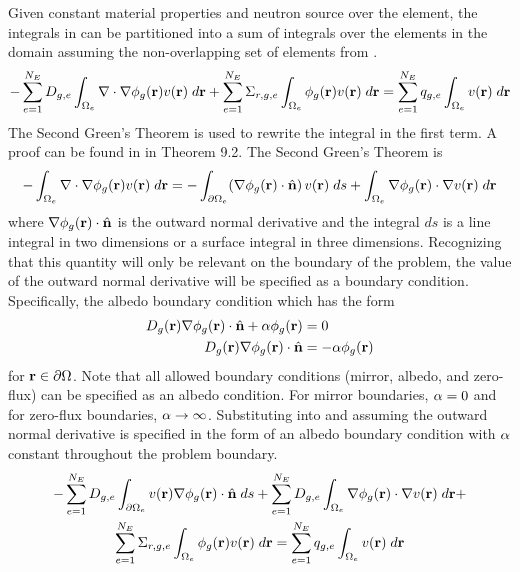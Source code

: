     Given constant material properties and neutron source over the element, 
    the integrals in  can be partitioned into a sum of 
    integrals over the elements in the domain assuming the non-overlapping set
    of elements from .
    \begin{equation} 
      \label{eq:element_by_element}
      -\sum_{e=1}^{N_E} D_{g,e} 
        \int_{\Omega_e} \mathbf{\nabla} \cdot \mathbf{\nabla} \phi_g(\mathbf{r}) v(\mathbf{r}) \; d\mathbf{r} +
        \sum_{e=1}^{N_E} \Sigma_{r,g,e} \int_{\Omega_e} \phi_g(\mathbf{r}) v(\mathbf{r}) 
        \;d\mathbf{r} = \sum_{e=1}^{N_E} q_{g,e} \int_{\Omega_e} v(\mathbf{r}) 
        \; d\mathbf{r}
    \end{equation}
    The Second Green's Theorem is used to rewrite the integral in the first
    term. A proof can be found in \cite{textbookli} in Theorem 9.2. The Second 
    Green's Theorem is 
    \begin{equation} 
      \label{eq:greens}
      -\int_{\Omega_e} \mathbf{\nabla} \cdot \mathbf{\nabla} \phi_g(\mathbf{r}) v(\mathbf{r}) \;d\mathbf{r} =
        -\int_{\partial \Omega_e}  
        (\mathbf{\nabla} \phi_g(\mathbf{r}) \cdot \hat{\mathbf{n}}) \, v(\mathbf{r})\; ds +
        \int_{\Omega_e} \mathbf{\nabla} \phi_g(\mathbf{r}) \cdot \mathbf{\nabla} v(\mathbf{r}) \; d\mathbf{r}
    \end{equation}
    where $\mathbf{\nabla} \phi_g(\mathbf{r}) \cdot \hat{\mathbf{n}}$ is the outward normal 
    derivative and the integral $ds$ is a line integral in two dimensions or a 
    surface integral in three dimensions. Recognizing that this quantity will
    only be relevant on the boundary of the problem, the value of the outward
    normal derivative will be specified as a boundary condition. Specifically,
    the albedo boundary condition which has the form 
    \begin{align}
      D_g(\mathbf{r}) \mathbf{\nabla} \phi_g(\mathbf{r}) \cdot \hat{\mathbf{n}} + \alpha \phi_g(\mathbf{r}) &= 0 \\
      D_g(\mathbf{r}) \mathbf{\nabla} \phi_g(\mathbf{r}) \cdot \hat{\mathbf{n}} &= -\alpha \phi_g(\mathbf{r})
    \end{align}
    for $\mathbf{r} \in \partial \Omega$. Note that all allowed boundary conditions
    (mirror, albedo, and zero-flux) can be specified as an albedo condition. For
    mirror boundaries, $\alpha = 0$ and for zero-flux boundaries, $\alpha
    \rightarrow \infty$.
    Substituting  into   and 
    assuming the outward normal derivative is specified in the form of an albedo
    boundary condition with $\alpha$ constant throughout the problem boundary.
    \begin{multline} 
      -\sum_{e=1}^{N_E} D_{g,e} \int_{\partial \Omega_e} v(\mathbf{r}) \mathbf{\nabla}
      \phi_g(\mathbf{r}) \cdot \hat{\mathbf{n}} \;ds + \sum_{e=1}^{N_E} 
        D_{g,e} \int_{\Omega_e} \mathbf{\nabla} \phi_g(\mathbf{r}) \cdot \mathbf{\nabla} v(\mathbf{r}) 
        \; d\mathbf{r} + \\
        \sum_{e=1}^{N_E} \Sigma_{r,g,e} \int_{\Omega_e} \phi_g(\mathbf{r}) v(\mathbf{r}) 
        \; d\mathbf{r} =
        \sum_{e=1}^{N_E} q_{g,e} \int_{\Omega_e} v(\mathbf{r}) \; d\mathbf{r}
    \end{multline}
